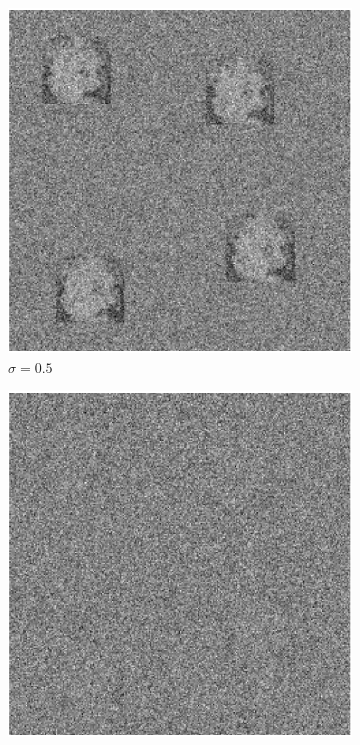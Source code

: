 \documentclass[english,11pt]{article}
\newcommand{\1}{\mathbf{1}}
\numberwithin{equation}{section}
\theoremstyle{plain}
\theoremstyle{definition}
\theoremstyle{remark}
\theoremstyle{plain}
\theoremstyle{remark}
\theoremstyle{plain}
\theoremstyle{plain}
\begin{document}
\begin{figure}[t]
\begin{subfigure}[h]{0.33\textwidth}
		\includegraphics[scale=0.5]{micrograph_Einstein_example_s05}
		\caption{$\sigma = 0.5$}
	\end{subfigure}
	\begin{subfigure}[h]{0.33\textwidth}
		\centering
		\includegraphics[scale=0.5]{micrograph_Einstein_example_s3}

\end{subfigure}
\end{figure}
\end{document}
